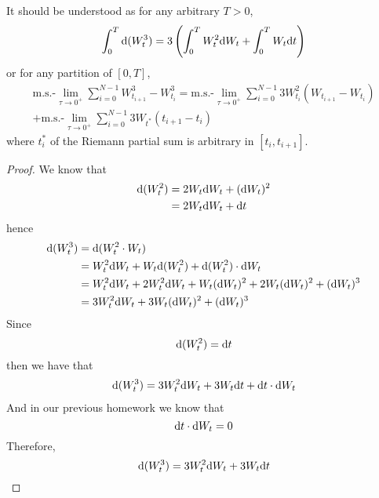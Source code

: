 \documentclass{homework}
\begin{document}
    \problem
    \begin{subproblem}[(\arabic*).]
        \item
        It should be understood as for any arbitrary $T>0$,
        \[\int_0^T\mathrm d(W_t^3)=3\left(\int_0^TW_t^2\mathrm d W_t
        +\int_0^TW_t\mathrm d t\right)\] 
        or for any partition of $[0,T]$,
        \begin{multline*}
            \text{m.s.-}\lim_{\tau\to 0^+}
        \sum_{i=0}^{N-1}
        W_{t_{i+1}}^3-W^3_{t_i}
        =\text{m.s.-}\lim_{\tau\to 0^+}
        \sum_{i=0}^{N-1}
        3W_{t_i}^2(W_{t_{i+1}}-W_{t_i})\\
        +\text{m.s.-}\lim_{\tau\to0^+}
        \sum_{i=0}^{N-1}3W_{t^*}(t_{i+1}-t_i)
        \end{multline*}
        where $t^*_i$ of the Riemann partial sum is arbitrary
        in $[t_i,t_{i+1}]$.

        \item
        \begin{proof}
            We know that
            \[\begin{aligned}
                \mathrm d (W_t^2)&=2W_t\mathrm d W_t+(\mathrm d W_t)^2\\
                &=2W_t\mathrm d W_t+\mathrm d t
            \end{aligned}\]
            hence
            \[\begin{aligned}
                \mathrm d(W_t^3)&=\mathrm d(W_t^2\cdot W_t)\\
                &=W_t^2\mathrm d W_t+W_t\mathrm d(W_t^2)+\mathrm d(W_t^2)\cdot\mathrm d W_t\\
                &=W_t^2\mathrm d W_t
                +2W_t^2\mathrm d W_t+W_t(\mathrm d W_t)^2
                +2W_t(\mathrm d W_t)^2+(\mathrm d W_t)^3\\
                &=3W_t^2\mathrm d W_t+3W_t(\mathrm d W_t)^2+(\mathrm d W_t)^3
            \end{aligned}\]
            Since
            \[\mathrm d(W^2_t)=\mathrm d t\]
            then we have that
            \[\begin{aligned}
                \mathrm d(W_t^3)=3W_t^2\mathrm d W_t+3W_t\mathrm d t+\mathrm d t\cdot\mathrm d W_t
            \end{aligned}\]
            And in our previous homework we know that
            \[\mathrm d t\cdot\mathrm d W_t=0\]
            Therefore,
            \[\mathrm d(W_t^3)=3W_t^2\mathrm d W_t+3W_t\mathrm d t\]
            \end{proof}
    \end{subproblem}
\end{document}
